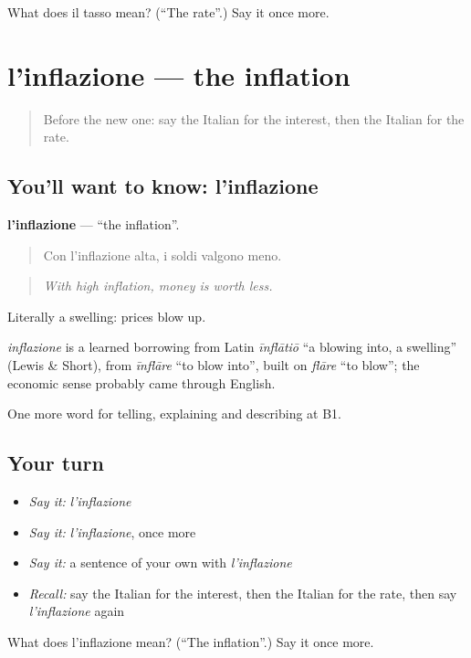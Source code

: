 \begin{tcolorbox}[breakable,colback=teal!4,colframe=teal!35!black,title={Before you move on}]
What does il tasso mean? (\textquotedblleft{}The rate\textquotedblright{}.) Say it once more.
\end{tcolorbox}
\section[l'inflazione]{l'inflazione — the inflation}

\label{lesson:IT-C395-inflazione}



\begin{quote}
Before the new one: say the Italian for the interest, then the Italian for the rate.
\end{quote}

\subsection*{You'll want to know: l'inflazione}
\textbf{l'inflazione} — \textquotedblleft{}the inflation\textquotedblright{}.

\begin{quote}
Con l'inflazione alta, i soldi valgono meno.
\end{quote}

\begin{quote}
\emph{With high inflation, money is worth less.}
\end{quote}

Literally a swelling: prices blow up.

\begin{cousinweb}
\emph{inflazione} is a learned borrowing from Latin \emph{īnflātiō} \textquotedblleft{}a blowing into, a swelling\textquotedblright{} (Lewis \& Short), from \emph{īnflāre} \textquotedblleft{}to blow into\textquotedblright{}, built on \emph{flāre} \textquotedblleft{}to blow\textquotedblright{}; the economic sense probably came through English.
\end{cousinweb}

\begin{grammarlens}[title={What you've built}]
One more word for telling, explaining and describing at B1.
\end{grammarlens}

\subsection*{Your turn}
\begin{itemize}
\raggedright
  \item \emph{Say it:} \emph{l'inflazione}
  \item \emph{Say it:} \emph{l'inflazione}, once more
  \item \emph{Say it:} a sentence of your own with \emph{l'inflazione}
  \item \emph{Recall:} say the Italian for the interest, then the Italian for the rate, then say \emph{l'inflazione} again
\end{itemize}

\begin{tcolorbox}[breakable,colback=teal!4,colframe=teal!35!black,title={Before you move on}]
What does l'inflazione mean? (\textquotedblleft{}The inflation\textquotedblright{}.) Say it once more.
\end{tcolorbox}
